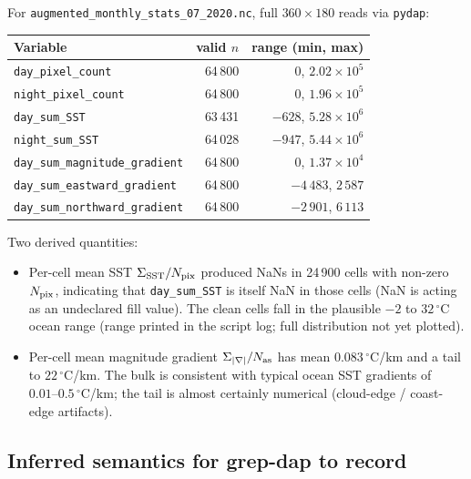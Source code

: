 \documentclass[11pt]{article}
\begin{document}
For \texttt{augmented\_monthly\_stats\_07\_2020.nc}, full $360\times
180$ reads via \texttt{pydap}:

\begin{center}
\begin{tabular}{@{}lrr@{}}
\toprule
Variable & valid $n$ & range (min, max) \\
\midrule
\texttt{day\_pixel\_count}              & 64\,800 & $0$, \quad $2.02 \times 10^{5}$ \\
\texttt{night\_pixel\_count}            & 64\,800 & $0$, \quad $1.96 \times 10^{5}$ \\
\texttt{day\_sum\_SST}                  & 63\,431 & $-628$, $5.28 \times 10^{6}$ \\
\texttt{night\_sum\_SST}                & 64\,028 & $-947$, $5.44 \times 10^{6}$ \\
\texttt{day\_sum\_magnitude\_gradient}  & 64\,800 & $0$, $1.37 \times 10^{4}$ \\
\texttt{day\_sum\_eastward\_gradient}   & 64\,800 & $-4\,483$, $2\,587$ \\
\texttt{day\_sum\_northward\_gradient}  & 64\,800 & $-2\,901$, $6\,113$ \\
\bottomrule
\end{tabular}
\end{center}

Two derived quantities:
\begin{itemize}
  \item Per-cell mean SST $\Sigma_{\rm SST} / N_{\rm pix}$ produced
    NaNs in 24\,900 cells with non-zero $N_{\rm pix}$, indicating
    that \texttt{day\_sum\_SST} is itself NaN in those cells (NaN
    is acting as an undeclared fill value). The clean cells fall
    in the plausible $-2$ to $32\,^\circ$C ocean range
    (range printed in the script log; full distribution not yet
    plotted).
  \item Per-cell mean magnitude gradient $\Sigma_{|\nabla|} /
    N_{\rm as}$ has mean $0.083\,^\circ$C/km and a tail to
    $22\,^\circ$C/km. The bulk is consistent with typical ocean
    SST gradients of $0.01\text{--}0.5\,^\circ$C/km; the tail is
    almost certainly numerical (cloud-edge / coast-edge
    artifacts).
\end{itemize}

\subsection{Inferred semantics for grep-dap to record}
\end{document}

